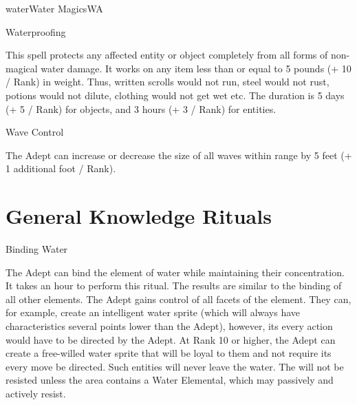 \begin{College}[1.3]{water}{Water Magics}{WA}
\begin{spell}[G-13]{Waterproofing}

\begin{effects}
This spell protects any affected entity or object completely from all
forms of non-magical water damage.  It works on any item less than or
equal to 5 pounds (+ 10 / Rank) in weight.  Thus, written scrolls
would not run, steel would not rust, potions would not dilute,
clothing would not get wet etc.  The duration is 5 days (+ 5 / Rank)
for objects, and 3 hours (+ 3 / Rank) for entities.
\end{effects}
\end{spell}

\begin{spell}[G-14]{Wave Control}

\begin{effects}
The Adept can increase or decrease the size of all waves within range
by 5 feet (+ 1 additional foot / Rank).
\end{effects}
\end{spell}


\section{General Knowledge Rituals}

\begin{ritual}[Q-1]{Binding Water}

\begin{effects}
The Adept can bind the element of water while maintaining their
concentration.  It takes an hour to perform this ritual.  The results
are similar to the binding of all other elements.  The Adept gains
control of all facets of the element. They can, for example, create an
intelligent water sprite (which will always have characteristics
several points lower than the Adept), however, its every action would
have to be directed by the Adept. At Rank 10 or higher, the Adept can
create a free-willed water sprite that will be loyal to them and not
require its every move be directed.  Such entities will never leave
the water.  The will not be resisted unless the area contains a Water
Elemental, which may passively and actively resist.
\end{effects}
\end{ritual}



\end{College}
